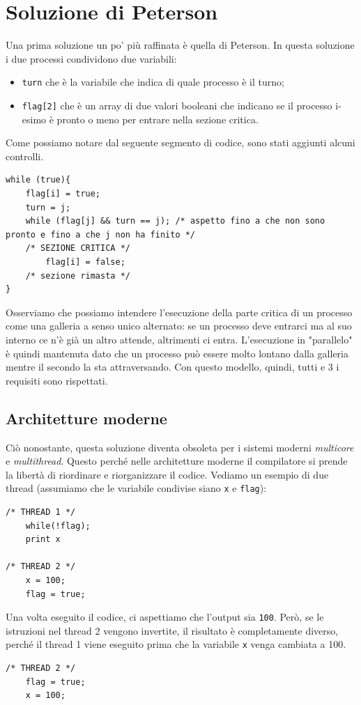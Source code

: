 \section{Soluzione di Peterson}
Una prima soluzione un po' più raffinata è quella di Peterson. In questa soluzione i due processi condividono due variabili:
\vspace{-5px}
\begin{itemize}
\setlength{\itemsep}{-.15 em}
    \item \texttt{turn} che è la variabile che indica di quale processo è il turno;
    \item \texttt{flag[2]} che è un array di due valori booleani che indicano se il processo i-esimo è pronto o meno per entrare nella sezione critica.
\end{itemize}

Come possiamo notare dal seguente segmento di codice, sono stati aggiunti alcuni controlli.
\begin{lstlisting}[caption={Soluzione di Peterson}]
while (true){
    flag[i] = true;
    turn = j;
    while (flag[j] && turn == j); /* aspetto fino a che non sono pronto e fino a che j non ha finito */
    /* SEZIONE CRITICA */
        flag[i] = false;
    /* sezione rimasta */
}
\end{lstlisting}
Osserviamo che possiamo intendere l'esecuzione della parte critica di un processo come una galleria a senso unico alternato: se un processo deve entrarci ma al suo interno ce n'è già un altro attende, altrimenti ci entra. L'esecuzione in "parallelo" è quindi mantenuta dato che un processo può essere molto lontano dalla galleria mentre il secondo la sta attraversando. Con questo modello, quindi, tutti e 3 i requisiti sono rispettati.
% 
\subsection{Architetture moderne}
Ciò nonostante, questa soluzione diventa obsoleta per i sistemi moderni \textit{multicore} e \textit{multithread}. Questo perché nelle architetture moderne il compilatore si prende la libertà di riordinare e riorganizzare il codice. Vediamo un esempio di due thread (assumiamo che le variabile condivise siano \texttt{x} e \texttt{flag}):
\begin{lstlisting}
/* THREAD 1 */
    while(!flag);
    print x

/* THREAD 2 */
    x = 100;
    flag = true;
\end{lstlisting}
Una volta eseguito il codice, ci aspettiamo che l'output sia \texttt{100}. Però, se le istruzioni nel thread 2 vengono invertite, il risultato è completamente diverso, perché il thread 1 viene eseguito prima che la variabile \texttt{x} venga cambiata a 100.
\begin{lstlisting}
/* THREAD 2 */
    flag = true;
    x = 100;
\end{lstlisting}

